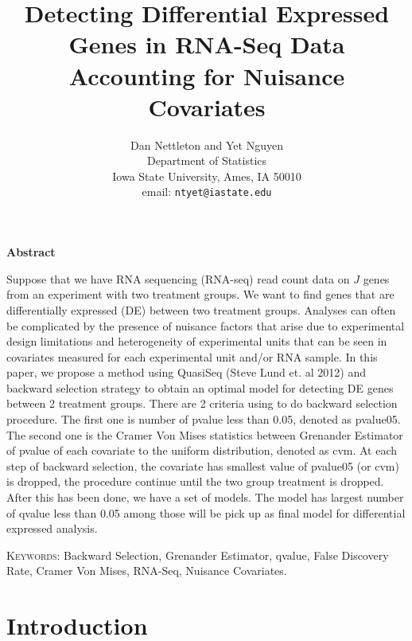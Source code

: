 \documentclass[11pt]{article}
\begin{document}
\title{Detecting Differential Expressed Genes in RNA-Seq Data \\ 
Accounting for Nuisance Covariates}
\author{Dan Nettleton  and Yet Nguyen\\
Department of Statistics \\ 
Iowa State University, Ames, IA 50010\\ 
email: \texttt{ntyet@iastate.edu} }

\maketitle



\newpage
\begin{center}
\textbf{Abstract}
\end{center}

Suppose that we have RNA sequencing (RNA-seq) read count data
on $J$ genes from an experiment with two treatment groups.
We want to find genes that are differentially expressed (DE) between
two treatment groups.
Analyses can often be complicated by the presence of nuisance factors
that arise due to experimental design limitations and heterogeneity of
experimental units that can be seen in  covariates
measured for each experimental unit and/or RNA sample. In this paper, we propose a method using QuasiSeq (Steve Lund et. al 2012) and backward selection strategy to obtain an optimal model for detecting DE genes between 2 treatment groups. 
There are 2 criteria using to do backward selection procedure. The first one is number of pvalue less than 0.05, denoted as pvalue05. The second one is the Cramer Von Mises statistics between Grenander Estimator of pvalue of each covariate to the uniform distribution, denoted as cvm. At each step of backward selection, the covariate has smallest value of pvalue05 (or cvm) is dropped, the procedure continue until the two group treatment is dropped. After this has been done, we have a set of models. The model has largest number of qvalue less than 0.05 among those will be pick up as final model for differential expressed analysis. 

\vspace*{.3in}

\noindent\textsc{Keywords}: {Backward Selection, Grenander Estimator, qvalue, False Discovery Rate, Cramer Von Mises, RNA-Seq, Nuisance Covariates.}

\newpage

\section{Introduction}
\end{document}
